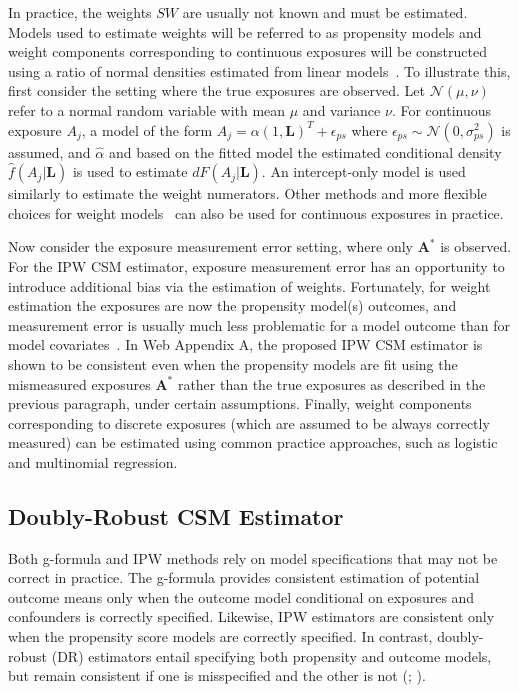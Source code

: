 \documentclass[useAMS,usenatbib,referee]{biom}
\begin{document}
In practice, the weights $SW$ are usually not known and must be estimated. Models used to estimate weights will be referred to as propensity models and weight components corresponding to continuous exposures will be constructed using a ratio of normal densities estimated from linear models~\citep{hirano2004}. To illustrate this, first consider the setting where the true exposures are observed. Let $\mathcal{N}(\mu, \nu)$ refer to a normal random variable with mean $\mu$ and variance $\nu$. For continuous exposure $A_{j}$, a model of the form $A_{j} = \alpha (1, \bm{L})^{T} + \epsilon_{ps} $ where $\epsilon_{ps} \sim \mathcal{N}(0, \sigma^{2}_{ps})$ is assumed, and $\hat{\alpha}$ and based on the fitted model the estimated conditional density  $\hat{f}(A_{j} | \bm{L})$ is used to estimate $dF(A_{j} | \bm{L})$. An intercept-only model is used similarly to estimate the weight numerators. Other methods and more flexible choices for weight models~\citep{naimi2014} can also be used for continuous exposures in practice.

Now consider the exposure measurement error setting, where only $\bm{A}^{*}$ is observed. For the IPW CSM estimator, exposure measurement error has an opportunity to introduce additional bias via the estimation of weights. Fortunately, for weight estimation the exposures are now the propensity model(s) outcomes, and measurement error is usually much less problematic for a model outcome than for model covariates~\citep{carroll2006}. In Web Appendix A, the proposed IPW CSM estimator is shown to be consistent even when the propensity models are fit using the mismeasured exposures $\bm{A}^{*}$ rather than the true exposures as described in the previous paragraph, under certain assumptions. Finally, weight components corresponding to discrete exposures (which are assumed to be always correctly measured) can be estimated using common practice approaches, such as logistic and multinomial regression.

\subsection{Doubly-Robust CSM Estimator}

Both g-formula and IPW methods rely on model specifications that may not be correct in practice. The g-formula provides consistent estimation of potential outcome means only when the outcome model conditional on exposures and confounders is correctly specified. Likewise, IPW estimators are consistent only when the propensity score models are correctly specified. In contrast, doubly-robust (DR) estimators entail specifying both propensity and outcome models, but remain consistent if one is misspecified and the other is not (\citealp*{robins1994}; \citealp{lunceford2004,bang2005}).
\end{document}
